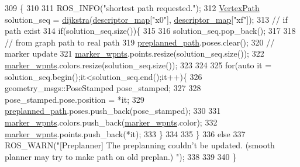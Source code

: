 \begin{DoxyCode}
309                                       \{
310 
311     ROS\_INFO(\textcolor{stringliteral}{"shortest path requested."});
312     \hyperlink{_common_8h_a225da2de31d0161f43841ed31cac064c}{VertexPath} solution\_seq = \hyperlink{class_preplanner_adff9209bb0422e7105f8bd3ed577fffd}{dijkstra}(\hyperlink{class_preplanner_a45603cfb24429584c4fc8bc42474e1ff}{descriptor\_map}[\textcolor{stringliteral}{"x0"}],
      \hyperlink{class_preplanner_a45603cfb24429584c4fc8bc42474e1ff}{descriptor\_map}[\textcolor{stringliteral}{"xf"}]);
313     \textcolor{comment}{// if path exist }
314     \textcolor{keywordflow}{if}(solution\_seq.size())\{
315 
316         solution\_seq.pop\_back();
317 
318         \textcolor{comment}{// from graph path to real path }
319         \hyperlink{class_preplanner_ace035c98e9dc23739402d346976d567b}{preplanned\_path}.poses.clear();
320         \textcolor{comment}{// marker update  }
321         \hyperlink{class_preplanner_adcc96f6ec12d7cb9980aa0c889b4ccd1}{marker\_wpnts}.points.resize(solution\_seq.size());
322         \hyperlink{class_preplanner_adcc96f6ec12d7cb9980aa0c889b4ccd1}{marker\_wpnts}.colors.resize(solution\_seq.size());  
323 
324 
325         \textcolor{keywordflow}{for}(\textcolor{keyword}{auto} it = solution\_seq.begin();it<solution\_seq.end();it++)\{
326             geometry\_msgs::PoseStamped pose\_stamped;
327 
328             pose\_stamped.pose.position = *it;
329             \hyperlink{class_preplanner_ace035c98e9dc23739402d346976d567b}{preplanned\_path}.poses.push\_back(pose\_stamped);
330 
331             \hyperlink{class_preplanner_adcc96f6ec12d7cb9980aa0c889b4ccd1}{marker\_wpnts}.colors.push\_back(\hyperlink{class_preplanner_adcc96f6ec12d7cb9980aa0c889b4ccd1}{marker\_wpnts}.color);
332             \hyperlink{class_preplanner_adcc96f6ec12d7cb9980aa0c889b4ccd1}{marker\_wpnts}.points.push\_back(*it);
333         \}
334     
335     \}
336     \textcolor{keywordflow}{else}
337         ROS\_WARN(\textcolor{stringliteral}{"[Preplanner] The preplanning couldn't be updated. (smooth planner may try to make path on
       old preplan.) "});
338     
339     
340 \}
\end{DoxyCode}
